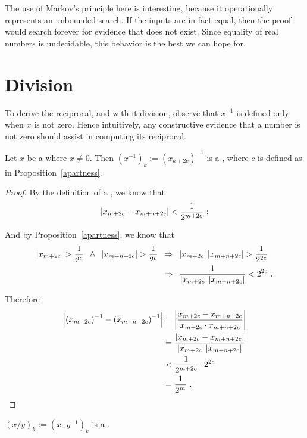 \documentclass[leqno]{report}
\begin{document}
The use of Markov's principle here is interesting, because it operationally represents an unbounded search. If the inputs are in fact equal, then the proof would search forever for evidence that does not exist. Since equality of real numbers is undecidable, this behavior is the best we can hope for.

\section{Division}

To derive the reciprocal, and with it division, observe that $x^{-1}$ is defined only when $x$ is not zero. Hence intuitively, any constructive evidence that a number is not zero should assist in computing its reciprocal.

\begin{Proposition}[Reciprocal]
    Let $x$ be a \FCCS{} where $x \neq 0$. Then $\left(x^{-1}\right)_k := \left(x_{k+2c}\right)^{-1}$ is a \FCCS, where $c$ is defined as in Proposition~\ref{apartness}.
\end{Proposition}

\begin{proof}
    By the definition of a \FCCS, we know that
    \[
        \left| x_{m+2c} - x_{m+n+2c} \right| < \frac{1}{2^{m+2c}} \ ;
    \]

    And by Proposition~\ref{apartness}, we know that
    \begin{align*}
        \left| x_{m+2c} \right| > \frac{1}{2^c} \enspace\wedge\enspace
        \left| x_{m+n+2c} \right| > \frac{1}{2^c}
        \enspace&\Rightarrow\enspace
        \left| x_{m+2c} \right| \left| x_{m+n+2c} \right| > \frac{1}{2^{2c}} \\
        &\Rightarrow\enspace
        \frac{1}{\left| x_{m+2c} \right| \left| x_{m+n+2c} \right|} < 2^{2c} \ .
    \end{align*}

    Therefore
    \begin{align*}
        \left| \left(x_{m+2c}\right)^{-1} - \left(x_{m+n+2c}\right)^{-1} \right|
        &= \left| \frac{x_{m+2c} - x_{m+n+2c}}{x_{m+2c} \cdot x_{m+n+2c}} \right| \\
        &= \frac{\left| x_{m+2c} - x_{m+n+2c} \right|}{\left| x_{m+2c} \right| \left| x_{m+n+2c} \right|} \\
        &< \frac{1}{2^{m+2c}} \cdot 2^{2c} \\
        &= \frac{1}{2^m} \ . \qedhere
    \end{align*}
\end{proof}

\begin{Corollary}[Division]
    $(x/y)_k := \left(x \cdot y^{-1}\right)_k$ is a \FCCS.
\end{Corollary}
\end{document}
